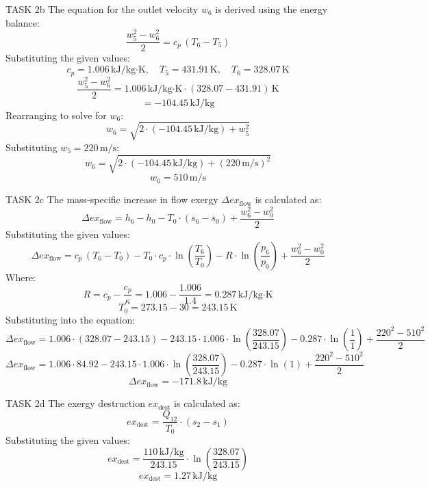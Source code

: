 TASK 2b  
The equation for the outlet velocity \( w_6 \) is derived using the energy balance:  
\[
\frac{w_5^2 - w_6^2}{2} = c_p \, (T_6 - T_5)
\]  
Substituting the given values:  
\[
c_p = 1.006 \, \text{kJ/kg·K}, \quad T_5 = 431.91 \, \text{K}, \quad T_6 = 328.07 \, \text{K}
\]  
\[
\frac{w_5^2 - w_6^2}{2} = 1.006 \, \text{kJ/kg·K} \cdot (328.07 - 431.91) \, \text{K}
\]  
\[
= -104.45 \, \text{kJ/kg}
\]  
Rearranging to solve for \( w_6 \):  
\[
w_6 = \sqrt{2 \cdot (-104.45 \, \text{kJ/kg}) + w_5^2}
\]  
Substituting \( w_5 = 220 \, \text{m/s} \):  
\[
w_6 = \sqrt{2 \cdot (-104.45 \, \text{kJ/kg}) + (220 \, \text{m/s})^2}
\]  
\[
w_6 = 510 \, \text{m/s}
\]  

TASK 2c  
The mass-specific increase in flow exergy \( \Delta ex_{\text{flow}} \) is calculated as:  
\[
\Delta ex_{\text{flow}} = h_6 - h_0 - T_0 \cdot (s_6 - s_0) + \frac{w_6^2 - w_0^2}{2}
\]  
Substituting the given values:  
\[
\Delta ex_{\text{flow}} = c_p \, (T_6 - T_0) - T_0 \cdot c_p \cdot \ln\left(\frac{T_6}{T_0}\right) - R \cdot \ln\left(\frac{p_6}{p_0}\right) + \frac{w_6^2 - w_0^2}{2}
\]  
Where:  
\[
R = c_p - \frac{c_p}{\kappa} = 1.006 - \frac{1.006}{1.4} = 0.287 \, \text{kJ/kg·K}
\]  
\[
T_0 = 273.15 - 30 = 243.15 \, \text{K}
\]  
Substituting into the equation:  
\[
\Delta ex_{\text{flow}} = 1.006 \cdot (328.07 - 243.15) - 243.15 \cdot 1.006 \cdot \ln\left(\frac{328.07}{243.15}\right) - 0.287 \cdot \ln\left(\frac{1}{1}\right) + \frac{220^2 - 510^2}{2}
\]  
\[
\Delta ex_{\text{flow}} = 1.006 \cdot 84.92 - 243.15 \cdot 1.006 \cdot \ln\left(\frac{328.07}{243.15}\right) - 0.287 \cdot \ln(1) + \frac{220^2 - 510^2}{2}
\]  
\[
\Delta ex_{\text{flow}} = -171.8 \, \text{kJ/kg}
\]  

TASK 2d  
The exergy destruction \( ex_{\text{dest}} \) is calculated as:  
\[
ex_{\text{dest}} = \frac{Q_{12}}{T_0} \cdot (s_2 - s_1)
\]  
Substituting the given values:  
\[
ex_{\text{dest}} = \frac{110 \, \text{kJ/kg}}{243.15} \cdot \ln\left(\frac{328.07}{243.15}\right)
\]  
\[
ex_{\text{dest}} = 1.27 \, \text{kJ/kg}
\]  